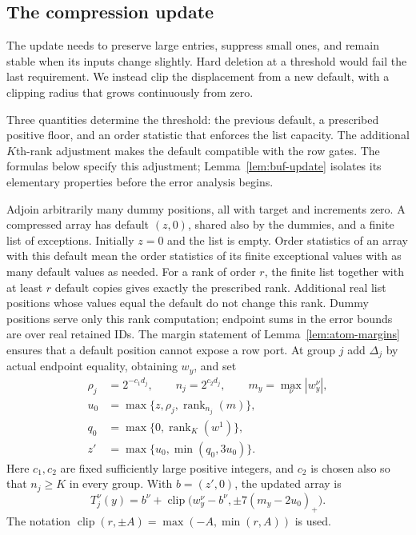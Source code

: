\subsection{The compression update}

The update needs to preserve large entries, suppress small ones, and remain stable when its inputs change slightly. Hard deletion at a threshold would fail the last requirement. We instead clip the displacement from a new default, with a clipping radius that grows continuously from zero.

Three quantities determine the threshold: the previous default, a prescribed positive floor, and an order statistic that enforces the list capacity. The additional $K$th-rank adjustment makes the default compatible with the row gates. The formulas below specify this adjustment; Lemma~\ref{lem:buf-update} isolates its elementary properties before the error analysis begins.

Adjoin arbitrarily many dummy positions, all with target and increments
zero.  A compressed array has default $(z,0)$, shared also by the dummies,
and a finite list of exceptions.  Initially $z=0$ and the list is empty.
Order statistics of an array with this default mean the order statistics
of its finite exceptional values with as many default values as needed.
For a rank of order $r$, the finite list together with at least $r$
default copies gives exactly the prescribed rank.  Additional real list
positions whose values equal the default do not change this rank.
Dummy positions serve only this rank computation; endpoint sums in the
error bounds are over real retained IDs.  The margin statement of
Lemma~\ref{lem:atom-margins} ensures that a default position cannot expose
a row port.
At group $j$ add $\Delta_j$ by actual endpoint equality, obtaining $w_y$,
and set
\begin{equation}
 \begin{aligned}
 \rho_j&=2^{-c_1d_j},\qquad n_j=2^{c_2d_j},\qquad
 m_y=\max_\nu|w_y^\nu|,\\
 u_0&=\max\{z,\rho_j,\operatorname{rank}_{n_j}(m)\},\\
 q_0&=\max\{0,\operatorname{rank}_K(w^1)\},\\
 z'&=\max\{u_0,\min(q_0,3u_0)\}.
 \end{aligned}
 \label{eq:buf-thresholds}
\end{equation}
Here $c_1,c_2$ are fixed sufficiently large positive integers, and
$c_2$ is chosen also so that $n_j\geq K$ in every group.
With $b=(z',0)$, the updated array is
\begin{equation}
 T_j^\nu(y)=b^\nu+
 \operatorname{clip}\bigl(w_y^\nu-b^\nu,
                \pm7(m_y-2u_0)_+\bigr).
 \label{eq:buf-update}
\end{equation}
The notation $\operatorname{clip}(r,\pm A)=\max(-A,\min(r,A))$ is used.

